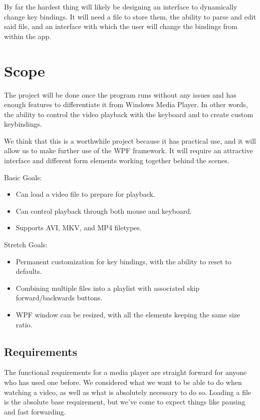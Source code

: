\documentclass[10pt,conference,onecolumn,compsoc]{IEEEtran}
\begin{document}
By far the hardest thing will likely be designing an interface to dynamically change key bindings. It will need a file to store them, the ability to parse and edit said file, and an interface with which the user will change the bindings from within the app. 


\section{Scope}


The project will be done once the program runs without any issues and has enough features to differentiate it from Windows Media Player. In other words, the ability to control the video playback with the keyboard and to create custom keybindings. 

We think that this is a worthwhile project because it has practical use, and it will allow us to make further use of the WPF framework. It will require an attractive interface and different form elements working together behind the scenes. 

Basic Goals:
\begin{itemize}
\item Can load a video file to prepare for playback.
\item Can control playback through both mouse and keyboard. 
\item Supports AVI, MKV, and MP4 filetypes. 
\end{itemize}

Stretch Goals:
\begin{itemize}

\item Permanent customization for key bindings, with the ability to reset to defaults. 
\item Combining multiple files into a playlist with associated skip forward/backwards buttons.
\item WPF window can be resized, with all the elements keeping the same size ratio. 
\end{itemize}

\subsection{Requirements}
The functional requirements for a media player are straight forward for anyone who has used one before. We considered what we want to be able to do when watching a video, as well as what is absolutely necessary to do so. Loading a file is the absolute base requirement, but we've come to expect things like pausing and fast forwarding.
\end{document}
